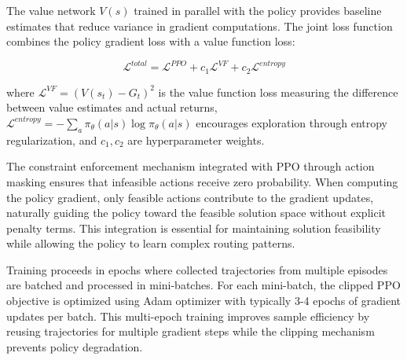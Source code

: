 The value network $V(s)$ trained in parallel with the policy provides baseline estimates that reduce variance in gradient computations. The joint loss function combines the policy gradient loss with a value function loss:

\begin{equation}
\mathcal{L}^{total} = \mathcal{L}^{PPO} + c_1 \mathcal{L}^{VF} + c_2 \mathcal{L}^{entropy}
\end{equation}

where $\mathcal{L}^{VF} = (V(s_t) - G_t)^2$ is the value function loss measuring the difference between value estimates and actual returns, $\mathcal{L}^{entropy} = -\sum_a \pi_\theta(a|s) \log \pi_\theta(a|s)$ encourages exploration through entropy regularization, and $c_1, c_2$ are hyperparameter weights.

The constraint enforcement mechanism integrated with PPO through action masking ensures that infeasible actions receive zero probability. When computing the policy gradient, only feasible actions contribute to the gradient updates, naturally guiding the policy toward the feasible solution space without explicit penalty terms. This integration is essential for maintaining solution feasibility while allowing the policy to learn complex routing patterns.

Training proceeds in epochs where collected trajectories from multiple episodes are batched and processed in mini-batches. For each mini-batch, the clipped PPO objective is optimized using Adam optimizer with typically 3-4 epochs of gradient updates per batch. This multi-epoch training improves sample efficiency by reusing trajectories for multiple gradient steps while the clipping mechanism prevents policy degradation.
